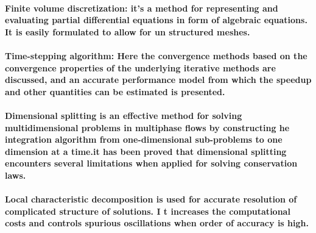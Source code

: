 \documentclass{article}
\begin{document}
\paragraph{Finite volume discretization: it’s a method for representing and evaluating partial differential equations in form of algebraic equations. It is easily formulated to allow for un structured meshes.}
\paragraph{Time-stepping algorithm: Here the convergence methods based on the convergence properties of the underlying iterative methods are discussed, and an accurate performance model from which the speedup and other quantities can be estimated is presented.}
\paragraph{Dimensional splitting is an effective method for solving multidimensional problems  in multiphase flows by constructing he integration algorithm from one-dimensional sub-problems to one  dimension at a time.it has been proved that dimensional splitting encounters several limitations when applied for solving conservation laws.}
\paragraph{Local characteristic decomposition is used for accurate resolution of complicated structure of solutions. I t increases the computational costs and controls spurious oscillations when order of accuracy is high.}
\end{document}
